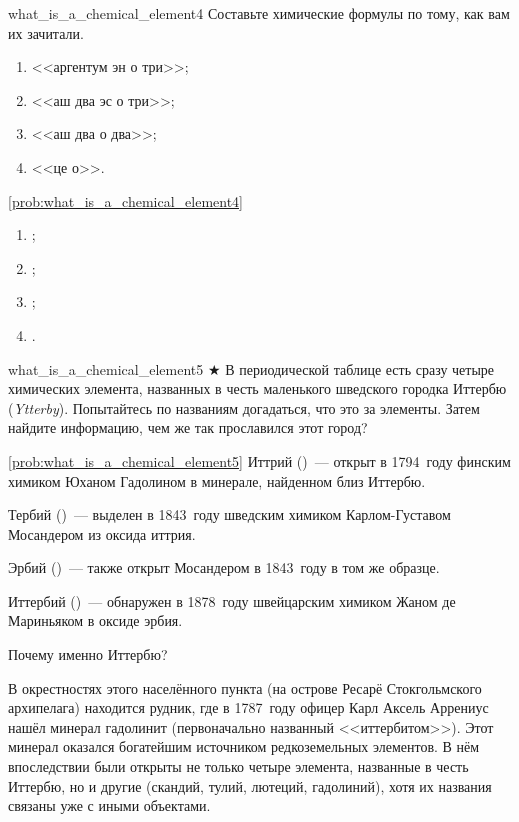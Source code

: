 \begin{problem}{}{what_is_a_chemical_element4}
    Составьте химические формулы по тому, как вам их зачитали.
    \begin{enumerate}
        \item <<аргентум эн о три>>;
        \item <<аш два эс о три>>;
        \item <<аш два о два>>;
        \item <<це о>>.
    \end{enumerate}

    \begin{sol}{\ref{prob:what_is_a_chemical_element4}}
        \begin{enumerate}
        \item {};
        \item {};
        \item {};
        \item {}.
    \end{enumerate}
    \end{sol}
\end{problem}

\begin{problem}{}{what_is_a_chemical_element5}
    $\bigstar$ В периодической таблице есть сразу четыре химических элемента, названных в честь маленького шведского городка Иттербю (\textit{Ytterby}). Попытайтесь по названиям догадаться, что это за элементы. Затем найдите информацию, чем же так прославился этот город?

    \begin{sol}{\ref{prob:what_is_a_chemical_element5}}
        Иттрий ()~--- открыт в 1794~году финским химиком Юханом Гадолином в минерале, найденном близ Иттербю.

        Тербий ()~--- выделен в 1843~году шведским химиком Карлом-Густавом Мосандером из оксида иттрия.

        Эрбий ()~--- также открыт Мосандером в 1843~году в том же образце.

        Иттербий ()~--- обнаружен в 1878~году швейцарским химиком Жаном де Мариньяком в оксиде эрбия.

        Почему именно Иттербю?

        В окрестностях этого населённого пункта (на острове Ресарё Стокгольмского архипелага) находится рудник, где в 1787~году офицер Карл Аксель Аррениус нашёл минерал гадолинит (первоначально названный <<иттербитом>>). Этот минерал оказался богатейшим источником редкоземельных элементов. В нём впоследствии были открыты не только четыре элемента, названные в честь Иттербю, но и другие (скандий, тулий, лютеций, гадолиний), хотя их названия связаны уже с иными объектами.
    \end{sol}
\end{problem}